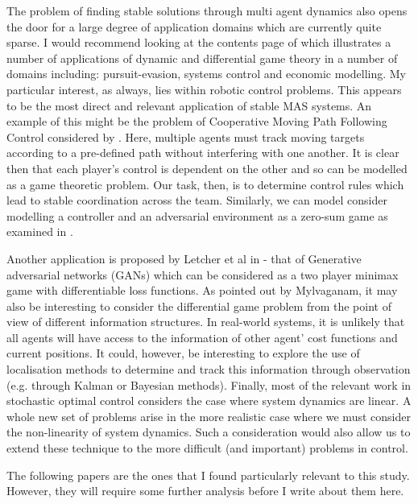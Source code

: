 \documentclass[preprint,11pt]{report}
\begin{document}
The problem of finding stable solutions through multi agent dynamics also opens the door for a large
degree of application domains which are currently quite sparse. I would recommend looking at the
contents page of \cite{Hamalainen1991DifferentialFinland} which illustrates a number of applications
of dynamic and differential game theory in a number of domains including: pursuit-evasion, systems
control and economic modelling. My particular interest, as always, lies within robotic control
problems. This appears to be the most direct and relevant application of stable MAS systems. An
example of this might be the problem of Cooperative Moving Path Following Control considered by
\cite{Reis2019RobustVehicles}. Here, multiple agents must track moving targets according to a
pre-defined path without interfering with one another. It is clear then that each player's control
is dependent on the other and so can be modelled as a game theoretic problem. Our task, then, is to
determine control rules which lead to stable coordination across the team. Similarly, we can model
consider modelling a controller and an adversarial environment as a zero-sum game as examined in
\cite{Marden2018AnnualControl}. 

Another application is proposed by Letcher et al in \cite{Letcher2019DifferentiableMechanics} - that
of Generative adversarial networks (GANs) which can be considered as a two player minimax game with
differentiable loss functions. As pointed out by Mylvaganam, it may also be interesting to consider
the differential game problem from the point of view of different information structures. In
real-world systems, it is unlikely that all agents will have access to the information of other
agent' cost functions and current positions. It could, however, be interesting to explore the use of
localisation methods to determine and track this information through observation (e.g. through
Kalman or Bayesian methods). Finally, most of the relevant work in stochastic optimal control
considers the case where system dynamics are linear. A whole new set of problems arise in the more
realistic case where we must consider the non-linearity of system dynamics. Such a consideration
would also allow us to extend these technique to the more difficult (and important) problems in
control.

The following papers \cite{Bailey2019FiniteDescent-Ascent, Bailey2019Multi-AgentSystem,
Boone2019FromTheory, DickensTheLearning, Berkenkamp2017SafeGuarantees,
Jin2018Stability-certifiedPerspective, Letcher2019DifferentiableMechanics} are the ones that I found
particularly relevant to this study. However, they will require some further analysis before I write
about them here.


 


\end{document}
